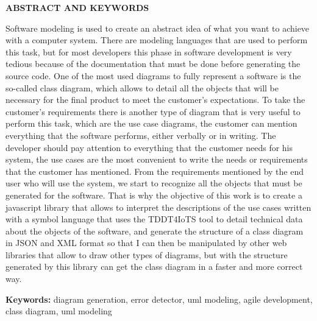 \begin{center}
	{\titulodc \textbf{ABSTRACT AND KEYWORDS}}
\end{center}

Software modeling is used to create an abstract idea of what you want to achieve with a computer system. There are modeling languages that are used to perform this task, but for most developers this phase in software development is very tedious because of the documentation that must be done before generating the source code. One of the most used diagrams to fully represent a software is the so-called class diagram, which allows to detail all the objects that will be necessary for the final product to meet the customer's expectations. To take the customer's requirements there is another type of diagram that is very useful to perform this task, which are the use case diagrams, the customer can mention everything that the software performs, either verbally or in writing. The developer should pay attention to everything that the customer needs for his system, the use cases are the most convenient to write the needs or requirements that the customer has mentioned. From the requirements mentioned by the end user who will use the system, we start to recognize all the objects that must be generated for the software. That is why the objective of this work is to create a javascript library that allows to interpret the descriptions of the use cases written with a symbol language that uses the TDDT4IoTS tool to detail technical data about the objects of the software, and generate the structure of a class diagram in JSON and XML format so that I can then be manipulated by other web libraries that allow to draw other types of diagrams, but with the structure generated by this library can get the class diagram in a faster and more correct way. 

\textbf{Keywords:} diagram generation, error detector, uml modeling, agile development, class diagram, uml modeling
